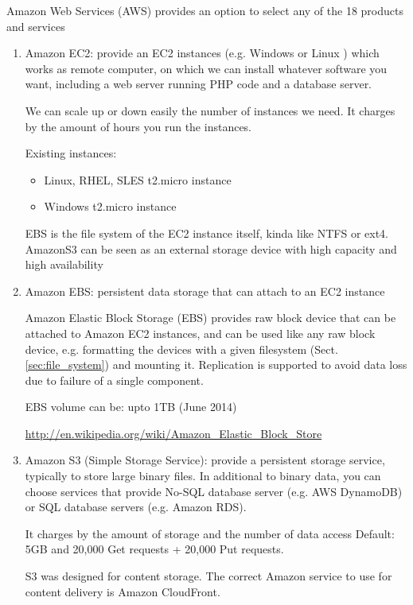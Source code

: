 Amazon Web Services (AWS) provides an option to select any of the 18 products
and services
\begin{enumerate}
  \item Amazon EC2: provide an EC2 instances (e.g. Windows or Linux ) which
  works as remote computer, on which we can install whatever software you want,
  including a web server running PHP code and a database server. 
  
  We can scale up or down easily the number of instances we need. It charges by
  the amount of hours you run the instances.
  
  Existing instances: 
  \begin{itemize}
    \item Linux, RHEL, SLES t2.micro instance
    \item Windows t2.micro instance
  \end{itemize}

  EBS is the file system of the EC2 instance itself, kinda like NTFS or ext4.
  AmazonS3 can be seen as an external storage device with high capacity and high
  availability

  \item Amazon EBS: persistent data storage that can attach to an EC2 instance

Amazon Elastic Block Storage (EBS) provides raw block device that can be
  attached to Amazon EC2 instances, and can be used like any raw block device,
  e.g. formatting the devices with a given filesystem
  (Sect.\ref{sec:file_system}) and mounting it. Replication is supported to
  avoid data loss due to failure of a single component.
  
  EBS volume can be:  upto 1TB (June 2014)
  
  \url{http://en.wikipedia.org/wiki/Amazon_Elastic_Block_Store}
  
  \item Amazon S3 (Simple Storage Service): provide a persistent storage
  service, typically to store large binary files. In additional to binary data,
  you can choose services that provide No-SQL database server (e.g. AWS
  DynamoDB) or SQL database servers (e.g.
  Amazon RDS).
  
  It charges by the amount of storage and the number of data access
  Default: 5GB and 20,000 Get requests + 20,000 Put requests.
  
  S3 was designed for content storage. The correct Amazon service to use for
  content delivery is Amazon CloudFront. 
  

\end{enumerate}
